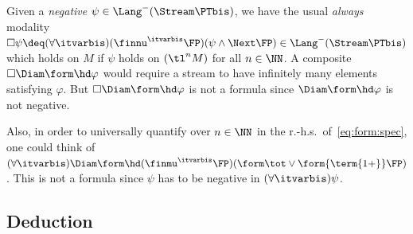 \begin{remark}
\label{rem:form:fix}
Given a \emph{negative} $\psi \in \Lang^-(\Stream\PTbis)$,
we have
the usual \emph{always} modality
\(
  \Box \psi
  \deq
  (\forall \itvarbis)(\finnu^\itvarbis \FP)(\psi \land \Next\FP)
  \in \Lang^-(\Stream\PTbis)
\)
which holds on
$M$ if $\psi$ holds on $(\tl^n M)$ for all $n \in \NN$.
A composite $\Box\Diam\form\hd\varphi$ would require a stream
to have infinitely many elements satisfying $\varphi$.
But $\Box\Diam\form\hd\varphi$ is not a formula since
$\Diam\form\hd\varphi$ is not negative.

Also, in order to 
universally quantify over $n \in \NN$
in the r.-h.s.\ of~\eqref{eq:form:spec},
one could think of
\(
  (\forall \itvarbis)\Diam\form\hd (\finmu^\itvarbis \FP)
  (\form\tot \lor \form{\term{1+}}\FP)
\).
This is not a formula
since $\psi$ has to be negative in $(\forall \itvarbis)\psi$.
\lipicsEnd
\end{remark}





\subsection{Deduction}
\label{sec:deduction}

